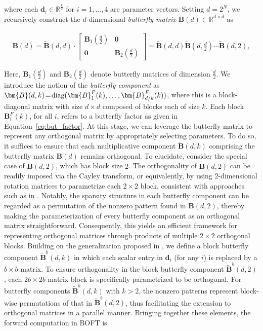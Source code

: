 where each $\bm{d}_i\in\mathbb{R}^{\frac{k}{2}}$ for $i=1,\ldots,4$ are parameter vectors. Setting $d=2^N$, we recursively construct the $d$-dimensional \emph{butterfly matrix} $\bm{B}(d)\in\mathbb{R}^{d\times d}$ as

\begin{equation}
\begin{aligned}
    \!\!\bm{B}(d)=\tilde{\bm{B}}(d,d)\!\cdot\!\begin{bmatrix}
    \bm{B}_1(\frac{d}{2})\!\!\!\!\! & \bm{0} \\
    \bm{0}\!\!\!\!\! &\bm{B}_2(\frac{d}{2})
    \end{bmatrix}= \tilde{\bm{B}}(d,d)\tilde{\bm{B}}(d,\frac{d}{2})\cdots\tilde{\bm{B}}(d,2),
\end{aligned}
\end{equation}

Here, $\bm{B}_1(\frac{d}{2})$ and $\bm{B}_2(\frac{d}{2})$ denote butterfly matrices of dimension $\frac{d}{2}$. We introduce the notion of the \emph{butterfly component} as $\thickmuskip=2mu \medmuskip=2mu \tilde{\bm{B}}(d,k)=\text{diag}(\bm{B}^F_1(k),\ldots,\bm{B}^F_{d/k}(k))$, where this is a block-diagonal matrix with size $d\times d$ composed of blocks each of size $k$. Each block $\bm{B}^F_i(k)$, for all $i$, refers to a butterfly factor as given in Equation~\ref{eq:but_factor}. At this stage, we can leverage the butterfly matrix to represent any orthogonal matrix by appropriately selecting parameters. To do so, it suffices to ensure that each multiplicative component $\tilde{\bm{B}}(d,k)$ comprising the butterfly matrix $\bm{B}(d)$ remains orthogonal. To elucidate, consider the special case of $\tilde{\bm{B}}(d,2)$, which has block size $2$. The orthogonality of $\tilde{\bm{B}}(d,2)$ can be readily imposed via the Cayley transform, or equivalently, by using $2$-dimensional rotation matrices to parametrize each $2\times 2$ block, consistent with approaches such as in \cite{liu2021orthogonal,qiu2023controlling}. Notably, the sparsity structure in each butterfly component can be regarded as a permutation of the nonzero pattern found in $\tilde{\bm{B}}(d,2)$, thereby making the parameterization of every butterfly component as an orthogonal matrix straightforward. Consequently, this yields an efficient framework for representing orthogonal matrices through products of multiple $2\times 2$ orthogonal blocks. Building on the generalization proposed in \cite{chen2022pixelated}, we define a block butterfly component $\tilde{\bm{B}}^b(d,k)$ in which each scalar entry in $\bm{d}_i$ (for any $i$) is replaced by a $b\times b$ matrix. To ensure orthogonality in the block butterfly component $\tilde{\bm{B}}^b(d,2)$, each $2b\times 2b$ matrix block is specifically parametrized to be orthogonal. For butterfly components $\tilde{\bm{B}}^b(d,k)$ with $k>2$, the nonzero patterns represent block-wise permutations of that in $\tilde{\bm{B}}^b(d,2)$, thus facilitating the extension to orthogonal matrices in a parallel manner. Bringing together these elements, the forward computation in BOFT is

